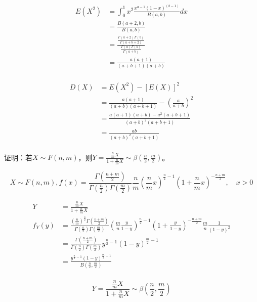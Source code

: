   \[
    \begin{split}
      E(X^2) &= \int_0^1 x^2 \frac{x^{a-1} (1-x)^(b-1)}{B(a, b)}dx\\
      &= \frac{B(a+2, b)}{B(a, b)}\\
      &= \frac{\frac{\Gamma (a+2) \Gamma (b)}{\Gamma (a+b+2)}}{\frac{\Gamma (a) \Gamma (b)}{\Gamma (a+b)}}\\
      &= \frac{a(a+1)}{(a+b+1)(a+b)}\\
    \end{split}
  \]

  \[
    \begin{split}
      D(X) &= E(X^2) - [E(X)]^2\\
      &= \frac{a(a+1)}{(a+b)(a+b+1)} - (\frac{a}{a+b})^2\\
      &= \frac{a(a+1)(a+b) - a^2(a+b+1)}{(a+b)^2 (a+b+1)}\\
      &= \frac{ab}{(a+b)^2(a+b+1)}\\
    \end{split}
  \]


   证明：若$X \sim F(n, m)$，则$Y = \frac{\frac{n}{m} X}{1+\frac{n}{m} X} \sim \beta (\frac{n}{2}, \frac{m}{2})$。

  \xsv
  \[
    X \sim F(n, m),
    f(x) = \frac{\Gamma (\frac{n+m}{2})}{\Gamma (\frac{n}{2}) \Gamma (\frac{m}{2})} \frac{n}{m} (\frac{n}{m} x)^{\frac{n}{2} - 1} (1+\frac{n}{m} x)^{-\frac{n+m}{2}}, \quad x>0
  \]

  \[
    \begin{split}
      Y &= \frac{\frac{n}{m} X}{1+\frac{n}{m} X}\\
      f_Y (y) &= \frac{(\frac{n}{m})^{\frac{n}{2}} \Gamma (\frac{n+m}{2})}{\Gamma (\frac{n}{2}) \Gamma (\frac{m}{2})} (\frac{m}{n} \frac{y}{1-y})^{\frac{n}{2} - 1} (1+\frac{y}{1-y})^{-\frac{n+m}{2}} \frac{m}{n} \frac{1}{(1-y)^2}\\
      &= \frac{\Gamma (\frac{n+m}{2})}{\Gamma (\frac{n}{2}) \Gamma (\frac{m}{2})} y^{\frac{n}{2} - 1} (1-y)^{\frac{m}{2} - 1}\\
      &= \frac{y^{\frac{n}{2} - 1} (1-y)^{\frac{m}{2} - 1}}{B(\frac{n}{2}, \frac{m}{2})}\\
    \end{split}
  \]

  $$Y = \frac{\frac{n}{m} X}{1+\frac{n}{m} X} \sim \beta (\frac{n}{2}, \frac{m}{2})$$
